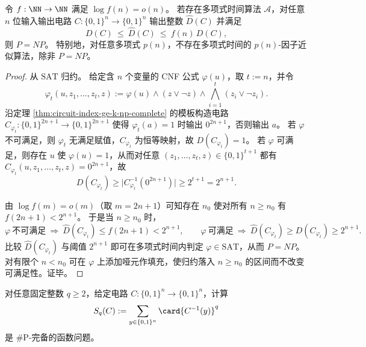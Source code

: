 \begin{theorem}[最大纤维的次指数因子近似障碍]\label{thm:circuit-maxfiber-polyfactor-inapprox}
令 \(f:\NN\to\NN\) 满足 \(\log f(n)=o(n)\)。
若存在多项式时间算法 \(\mathcal A\)，对任意 \(n\) 位输入输出电路 \(C:\{0,1\}^n\to\{0,1\}^n\) 输出整数 \(\widehat D(C)\) 并满足
\[
D(C)\ \le\ \widehat D(C)\ \le\ f(n)\,D(C),
\]
则 \(P=NP\)。
特别地，对任意多项式 \(p(n)\)，不存在多项式时间的 \(p(n)\)-因子近似算法，除非 \(P=NP\)。
\end{theorem}
\begin{proof}
从 \(\mathrm{SAT}\) 归约。
给定含 \(n\) 个变量的 CNF 公式 \(\varphi(u)\)，取 \(t:=n\)，并令
\[
\varphi_t(u,z_1,\dots,z_t,z):=\varphi(u)\wedge(z\vee\neg z)\wedge\bigwedge_{i=1}^{t}(z_i\vee\neg z_i).
\]
沿定理 \ref{thm:circuit-index-ge-k-np-complete} 的模板构造电路
\(
C_{\varphi_t}:\{0,1\}^{2n+1}\to\{0,1\}^{2n+1}
\)
使得 \(\varphi_t(a)=1\) 时输出 \(0^{2n+1}\)，否则输出 \(a\)。
若 \(\varphi\) 不可满足，则 \(\varphi_t\) 无满足赋值，\(C_{\varphi_t}\) 为恒等映射，故 \(D(C_{\varphi_t})=1\)。
若 \(\varphi\) 可满足，则存在 \(u\) 使 \(\varphi(u)=1\)，从而对任意 \((z_1,\dots,z_t,z)\in\{0,1\}^{t+1}\) 都有 \(C_{\varphi_t}(u,z_1,\dots,z_t,z)=0^{2n+1}\)，故
\[
D(C_{\varphi_t})\ge \bigl|C_{\varphi_t}^{-1}(0^{2n+1})\bigr|\ge 2^{t+1}=2^{n+1}.
\]
\par
由 \(\log f(m)=o(m)\)（取 \(m=2n+1\)）可知存在 \(n_0\) 使对所有 \(n\ge n_0\) 有 \(f(2n+1)<2^{n+1}\)。
于是当 \(n\ge n_0\) 时，
\[
\varphi\ \text{不可满足}\ \Rightarrow\ \widehat D(C_{\varphi_t})\le f(2n+1)<2^{n+1},
\qquad
\varphi\ \text{可满足}\ \Rightarrow\ \widehat D(C_{\varphi_t})\ge D(C_{\varphi_t})\ge 2^{n+1}.
\]
比较 \(\widehat D(C_{\varphi_t})\) 与阈值 \(2^{n+1}\) 即可在多项式时间内判定 \(\varphi\in\mathrm{SAT}\)，从而 \(P=NP\)。
对有限个 \(n<n_0\) 可在 \(\varphi\) 上添加哑元作填充，使归约落入 \(n\ge n_0\) 的区间而不改变可满足性。证毕。
\end{proof}

\begin{theorem}[任意固定阶 \texorpdfstring{$q\ge 2$}{q>=2} 的电路碰撞矩为 \texorpdfstring{\(\#\mathrm{P}\)}{\#P} 完备]\label{thm:circuit-s2-sharpP-complete}
对任意固定整数 \(q\ge 2\)，给定电路 \(C:\{0,1\}^n\to\{0,1\}^n\)，计算
\[
S_q(C):=\sum_{y\in\{0,1\}^n}\card{C^{-1}(y)}^{q}
\]
是 \(\#\mathrm{P}\)-完备的函数问题。
\end{theorem}

